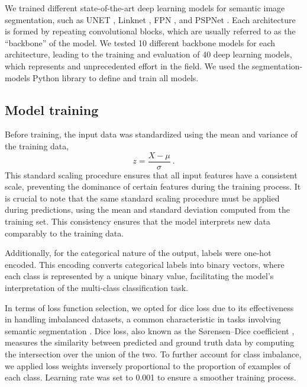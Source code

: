 We trained different state-of-the-art deep learning models for semantic image
segmentation, such as UNET \cite{Ronneberger2015}, Linknet
\cite{Chaurasia2017}, FPN \cite{Lin2017}, and PSPNet \cite{Zhao2017}. Each
architecture is formed by repeating convolutional blocks, which are usually
referred to as the ``backbone'' of the model. We tested 10 different backbone
models for each architecture, leading to the training and evaluation of 40 deep
learning models, which represents and unprecedented effort in the field. We
used the segmentation-models Python library \cite{segmentation_models} to
define and train
all models.

\subsection{Model training}

Before training, the input data was standardized using the mean and variance of
the training data,
\begin{equation}
    z=\frac{X-\mu}{\sigma} \ .
\end{equation}
This standard scaling procedure ensures that all input features have a
consistent scale, preventing the dominance of certain features during the
training process. It is crucial to note that the same standard scaling
procedure must be applied during predictions, using the mean and standard
deviation computed from the training set. This consistency ensures that the
model interprets new data comparably to the training data.

Additionally, for the categorical nature of the output, labels were one-hot
encoded. This encoding converts categorical labels into binary vectors, where
each class is represented by a unique binary value, facilitating the model's
interpretation of the multi-class classification task.

In terms of loss function selection, we opted for dice loss due to its
effectiveness in handling imbalanced datasets, a common characteristic in tasks
involving semantic segmentation \cite{rahman2016optimizing}. Dice loss, also
known as the Sørensen–Dice coefficient \cite{sorensen1948method,
    dice1945measures}, measures the similarity between predicted and ground
truth
data by computing the intersection over the union of the two. To further
account for class imbalance, we applied loss weights inversely proportional to
the proportion of examples of each class. Learning rate was set to 0.001 to
ensure a smoother training process.

